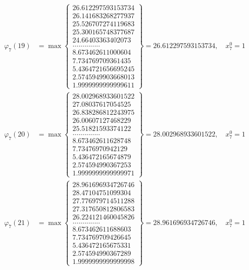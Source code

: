 \documentclass{article}
\begin{document}
\begin{align*}
  
  
  
\varphi_{7}(19) &= \max \left\{ \begin{array}{c}
26.612297593153734 \\
 26.141683268277937 \\
 25.526707274119683 \\
 25.300165748377687 \\
 24.66403363402073 \\
 .............. \\
 8.673462611000604 \\
 7.734769709361435 \\
 5.4364721656695245 \\
 2.5745949903668013 \\
 1.9999999999999611
\end{array} \right\} = 26.612297593153734, \quad x_{7}^0 = 1\\
  
  
  
  
\varphi_{7}(20) &= \max \left\{ \begin{array}{c}
28.002968933601522 \\
 27.08037617054525 \\
 26.838286812243975 \\
 26.00607127468229 \\
 25.51821593374122 \\
 .............. \\
 8.673462611628748 \\
 7.73476970942129 \\
 5.436472165674879 \\
 2.574594990367253 \\
 1.9999999999999971
\end{array} \right\} = 28.002968933601522, \quad x_{7}^0 = 1\\
  
  
  
  
\varphi_{7}(21) &= \max \left\{ \begin{array}{c}
28.961696934726746 \\
 28.47104751099304 \\
 27.776979714511288 \\
 27.317650812806583 \\
 26.224121460045826 \\
 .............. \\
 8.673462611688603 \\
 7.734769709426645 \\
 5.436472165675331 \\
 2.574594990367289 \\
 1.9999999999999998
\end{array} \right\} = 28.961696934726746, \quad x_{7}^0 = 1\\
  

\end{align*}
\end{document}
